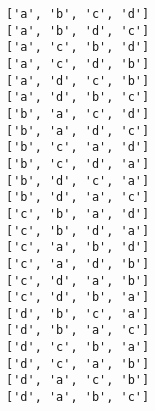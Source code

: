     \begin{Verbatim}[commandchars=\\\{\}]
['a', 'b', 'c', 'd']
['a', 'b', 'd', 'c']
['a', 'c', 'b', 'd']
['a', 'c', 'd', 'b']
['a', 'd', 'c', 'b']
['a', 'd', 'b', 'c']
['b', 'a', 'c', 'd']
['b', 'a', 'd', 'c']
['b', 'c', 'a', 'd']
['b', 'c', 'd', 'a']
['b', 'd', 'c', 'a']
['b', 'd', 'a', 'c']
['c', 'b', 'a', 'd']
['c', 'b', 'd', 'a']
['c', 'a', 'b', 'd']
['c', 'a', 'd', 'b']
['c', 'd', 'a', 'b']
['c', 'd', 'b', 'a']
['d', 'b', 'c', 'a']
['d', 'b', 'a', 'c']
['d', 'c', 'b', 'a']
['d', 'c', 'a', 'b']
['d', 'a', 'c', 'b']
['d', 'a', 'b', 'c']

    \end{Verbatim}